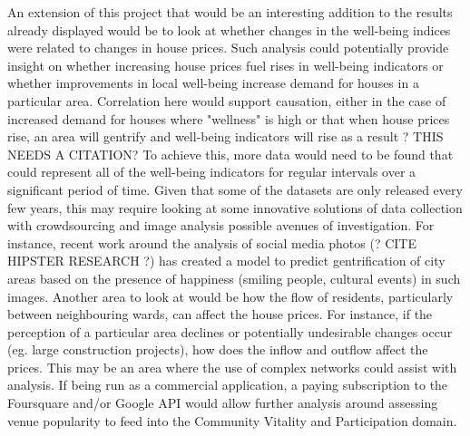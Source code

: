 An extension of this project that would be an interesting addition to the results already displayed would be to look at whether changes in the well-being indices were related to changes in house prices. Such analysis could potentially provide insight on whether increasing house prices fuel rises in well-being indicators or whether improvements in local well-being increase demand for houses in a particular area. Correlation here would support causation, either in the case of increased demand for houses where "wellness" is high or that when house prices rise, an area will gentrify and well-being indicators will rise as a result ? THIS NEEDS A CITATION?
To achieve this, more data would need to be found that could represent all of the well-being indicators for regular intervals over a significant period of time. Given that some of the datasets are only released every few years, this may require looking at some innovative solutions of data collection with crowdsourcing and image analysis possible avenues of investigation. For instance, recent work around the analysis of social media photos (? CITE HIPSTER RESEARCH ?) has created a model to predict gentrification of city areas based on the presence of happiness (smiling people, cultural events) in such images.
Another area to look at would be how the flow of residents, particularly between neighbouring wards, can affect the house prices. For instance, if the perception of a particular area declines or potentially undesirable changes occur (eg. large construction projects), how does the inflow and outflow affect the prices. This may be an area where the use of complex networks could assist with analysis.
If being run as a commercial application, a paying subscription to the Foursquare and/or Google API would allow further analysis around assessing venue popularity to feed into the Community Vitality and Participation domain.

